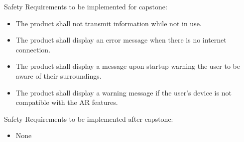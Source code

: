 \documentclass{article}
\begin{document}

Safety Requirements to be implemented for capstone:
\begin{itemize}
    \item The product shall not transmit information while not in use.
    \item The product shall display an error message when there is no internet connection.
    \item The product shall display a message upon startup warning the user to be aware of their surroundings.
    \item The product shall display a warning message if the user's device is not compatible with the AR features.
\end{itemize}

Safety Requirements to be implemented after capstone:
\begin{itemize}
    \item None
\end{itemize}
\end{document}
